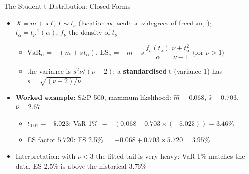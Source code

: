 \begin{frame}{The Student-t Distribution: Closed Forms}
\itemsize{\footnotesize}
\begin{itemize}
    \item $X = m + s\,T$, $T \sim t_\nu$ (location $m$, scale $s$, $\nu$ degrees of freedom, ); $t_\alpha = t_\nu^{-1}(\alpha)$, $f_\nu$ the density of $t_\nu$
    \begin{itemize}
        \item $\mathrm{VaR}_\alpha = -(m + s\,t_\alpha)$, \quad $\mathrm{ES}_\alpha = -m + s\,\dfrac{f_\nu(t_\alpha)}{\alpha}\,\dfrac{\nu + t_\alpha^2}{\nu - 1}$ (for $\nu > 1$)
        \item the variance is $s^2\nu/(\nu - 2)$: a \textbf{standardised} t (variance 1) has $s = \sqrt{(\nu - 2)/\nu}$
    \end{itemize}
    \item \textbf{Worked example}: S\&P 500, maximum likelihood: $\hat m = 0.068$, $\hat s = 0.703$, $\hat\nu = 2.67$
    \begin{itemize}
        \item $t_{0.01} = -5.023$: VaR 1\% $= -(0.068 + 0.703 \times (-5.023)) = 3.46\%$
        \item ES factor $5.720$: ES 2.5\% $= -0.068 + 0.703 \times 5.720 = 3.95\%$
    \end{itemize}
    \item Interpretation: with $\nu < 3$ the fitted tail is very heavy: VaR 1\% matches the data, ES 2.5\% is above the historical $3.76\%$
\end{itemize}
\end{frame}

